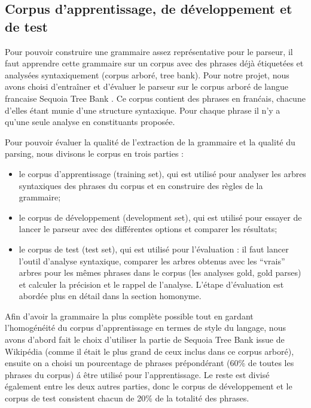 \documentclass[12pt]{article}
\begin{document}
\subsection{Corpus d'apprentissage, de d\'eveloppement et de test}
Pour pouvoir construire une grammaire assez repr\'esentative pour le parseur, il
faut apprendre cette grammaire sur un corpus avec des phrases d\'ej\`a
\'etiquet\'ees et analys\'ees syntaxiquement (corpus arbor\'e, tree bank). Pour notre projet, nous
avons choisi d'entra\^iner et d'\'evaluer le parseur sur le corpus arbor\'e de
langue francaise Sequoia Tree Bank \cite{Sequoia}. Ce corpus contient des
phrases en fran\'cais, chacune d'elles \'etant munie d'une structure syntaxique.
Pour chaque phrase il n'y a qu'une seule analyse en constituants propos\'ee.\par

Pour pouvoir \'evaluer la qualit\'e de l'extraction de la grammaire et la qualit\'e du
parsing, nous divisons le corpus en trois parties :
\begin{itemize}
  \item le corpus d'apprentissage (training set), qui est utilis\'e pour analyser
  les arbres syntaxiques des phrases du corpus et en construire des r\`egles de la
  grammaire;
  \item le corpus de d\'eveloppement (development set), qui est utilis\'e pour
  essayer de lancer le parseur avec des diff\'erentes options et comparer les
  r\'esultats;
  \item le corpus de test (test set), qui est utilis\'e pour l'\'evaluation :
  il faut lancer l'outil d'analyse syntaxique, comparer les arbres obtenus avec les ``vrais'' arbres
  pour les m\^emes phrases dans le corpus (les analyses gold, gold parses) et
  calculer la pr\'ecision et le rappel de l'analyse.
  L'\'etape d'\'evaluation est abord\'ee plus en d\'etail dans la section homonyme.
\end{itemize}

Afin d'avoir la grammaire la plus compl\`ete possible tout en gardant
l'homog\'en\'eit\'e du corpus d'apprentissage en termes de style du langage,
nous avons d'abord fait le choix d'utiliser la partie de Sequoia Tree Bank
issue de Wikip\'edia (comme il \'etait le plus grand de ceux inclus dans ce
corpus arbor\'e), ensuite on a choisi un pourcentage de phrases pr\'epond\'erant
(60\% de toutes les phrases du corpus) \'a \^etre utilis\'e pour l'apprentissage. 
Le reste est divis\'e \'egalement entre les deux autres parties, donc le corpus de d\'eveloppement 
et le corpus de test consistent chacun de 20\% de la totalit\'e des phrases. \par
\end{document}
